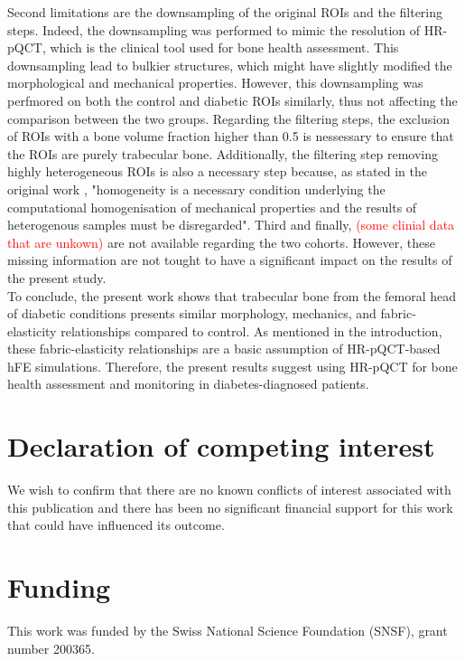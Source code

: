 \documentclass[a4paper,fleqn]{DC_ArtStyle}
\begin{document}
	Second limitations are the downsampling of the original ROIs and the filtering steps.
	Indeed, the downsampling was performed to mimic the resolution of HR-pQCT, which is the clinical tool used for bone health assessment.
	This downsampling lead to bulkier structures, which might have slightly modified the morphological and mechanical properties.
	However, this downsampling was perfmored on both the control and diabetic ROIs similarly, thus not affecting the comparison between the two groups.
	Regarding the filtering steps, the exclusion of ROIs with a bone volume fraction higher than 0.5 is nessessary to ensure that the ROIs are purely trabecular bone.
	Additionally, the filtering step removing highly heterogeneous ROIs is also a necessary step because, as stated in the original work \cite{Simon2022}, "homogeneity is a necessary condition underlying the computational homogenisation of mechanical properties and the results of heterogenous samples must be disregarded".
	Third and finally, \textcolor{red}{(some clinial data that are unkown)} are not available regarding the two cohorts.
	However, these missing information are not tought to have a significant impact on the results of the present study.
	\\[0.5em]
	To conclude, the present work shows that trabecular bone from the femoral head of diabetic conditions presents similar morphology, mechanics, and fabric-elasticity relationships compared to control.
	As mentioned in the introduction, these fabric-elasticity relationships are a basic assumption of HR-pQCT-based hFE simulations.
	Therefore, the present results suggest using HR-pQCT for bone health assessment and monitoring in diabetes-diagnosed patients.

	
	\section*{Declaration of competing interest}
	We wish to confirm that there are no known conflicts of interest associated with this publication and there has been no significant financial support for this work that could have influenced its outcome.
	
	\section*{Funding}
	This work was funded by the Swiss National Science Foundation (SNSF), grant number 200365.
\end{document}
